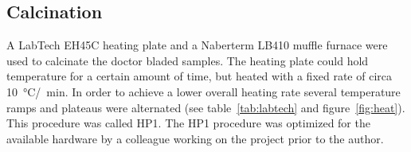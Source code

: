 \documentclass[a4paper]{article}
\newcommand{\td}[1]{\textcolor{red}{#1}}
\newcommand{\minutes}[1]{\SI{#1}{\minute}}
\newcommand{\oc}[1]{\SI{#1}{\degreeCelsius}}
\begin{document}
\subsection{Calcination}
A LabTech EH45C heating plate and a Naberterm LB410 muffle furnace were used to calcinate 
the doctor bladed samples. 
The heating plate could hold temperature for a certain amount of time, but heated with a 
fixed rate of circa \oc{10}/\minutes{}.
In order to achieve a lower overall heating rate several temperature ramps and plateaus 
were alternated (see table~\ref{tab:labtech} and figure~\ref{fig:heat}).
This procedure was called HP1.
The HP1 procedure was optimized for the available hardware by a colleague working on the 
project prior to the author.
\end{document}
